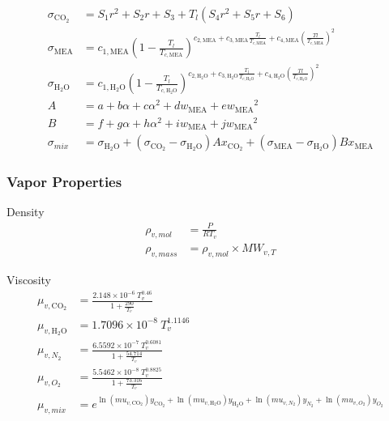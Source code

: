 \documentclass[12pt, letterpaper]{article}
\begin{document}
                    \begin{align}
                        \sigma _{\mathrm{CO}_2} &= S_1 r^2+S_2 r+S_3+T_l \left(S_4 r^2+S_5 r+S_6\right) \\
                        \sigma _{\mathrm{MEA}} &= c_{1,\mathrm{MEA}} \left(1-\frac{T_l}{T_{c,\mathrm{MEA}}}\right)^{c_{2,\mathrm{MEA}}+c_{3,\mathrm{MEA}} \frac{T_l}{T_{c,\mathrm{MEA}}}+c_{4,\mathrm{MEA}} \left(\frac{Tl}{T_{c,\mathrm{MEA}}}\right)^2} \\
                        \sigma _{\mathrm{H_{2}O}} &= c_{1,\mathrm{H_{2}O}} \left(1-\frac{T_l}{T_{c,\mathrm{H_{2}O}}}\right)^{c_{2,\mathrm{H_{2}O}}+c_{3,\mathrm{H_{2}O}} \frac{T_l}{T_{c,\mathrm{H_{2}O}}}+c_{4,\mathrm{H_{2}O}} \left(\frac{Tl}{T_{c,\mathrm{H_{2}O}}}\right)^2} \\
                        A &= a+b \alpha+c {\alpha}^2+d w_{\mathrm{MEA}}+e {w_{\mathrm{MEA}}}^2 \\
                        B &= f+g \alpha+h {\alpha}^2+i w_{\mathrm{MEA}}+j {w_{\mathrm{MEA}}}^2 \\
                        \sigma _{mix} &= \sigma_{\mathrm{H_{2}O}}+\left(\sigma_{\mathrm{CO}_2}-\sigma_{\mathrm{H_{2}O}}\right) A x_{\mathrm{CO}_2}+\left(\sigma_{\mathrm{MEA}}-\sigma_{\mathrm{H_{2}O}}\right) B x_{\mathrm{MEA}}
                    \end{align}
                
        
            \subsubsection{Vapor Properties}
                Density
                \begin{align}
                    \rho _{v,mol} &= \frac{P}{RT_v} \\
                    \rho _{v,mass} &= \rho _{v,mol} \times MW_{v,T}
                \end{align}
                
                Viscosity
                \begin{align}
                    \mu _{v,\mathrm{CO}_2} &= \frac{2.148 \times 10^{-6} \ T_v^{0.46}}{1+\frac{290}{T_v}} \\
                    \mu _{v,\mathrm{H_{2}O}} &= 1.7096\times 10^{-8} \ T_v^{1.1146} \\
                    \mu _{v,N_2} &= \frac{6.5592\times 10^{-7} \ T_v^{0.6081}}{1+\frac{54.714}{T_v}} \\
                    \mu _{v,O_2} &= \frac{5.5462\times 10^{-8} \ T_v^{0.8825}}{1+\frac{73.316}{T_v}} \\
                    \mu _{v,mix} &= e^{\ln\left(mu_{v,\mathrm{CO}_2}\right) y_{\mathrm{CO}_2}+\ln\left(mu_{v,\mathrm{H_{2}O}}\right) y_{\mathrm{H_{2}O}}+\ln\left(mu_{v,N_2}\right) y_{N_2}+\ln\left(mu_{v,O_2}\right) y_{O_2}}
                \end{align}
                
\end{document}
